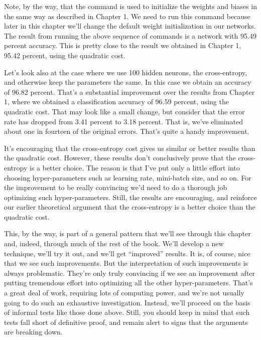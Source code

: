 \documentclass[a4paper,twoside,10pt]{book}
\begin{document}
Note, by the way, that the  command is used to initialize the weights and biases in the same way as described in Chapter 1. We need to run this command because later in this chapter we'll change the default weight initialization in our networks. The result from running the above sequence of commands is a network with 95.49 percent accuracy. This is pretty close to the result we obtained in Chapter 1, 95.42 percent, using the quadratic cost.
	
Let's look also at the case where we use 100 hidden neurons, the cross-entropy, and otherwise keep the parameters the same. In this case we obtain an accuracy of 96.82 percent. That's a substantial improvement over the results from Chapter 1, where we obtained a classification accuracy of 96.59 percent, using the quadratic cost. That may look like a small change, but consider that the error rate has dropped from 3.41 percent to 3.18 percent. That is, we've eliminated about one in fourteen of the original errors. That's quite a handy improvement.
	
It's encouraging that the cross-entropy cost gives us similar or better results than the quadratic cost. However, these results don't conclusively prove that the cross-entropy is a better choice. The reason is that I've put only a little effort into choosing hyper-parameters such as learning rate, mini-batch size, and so on. For the improvement to be really convincing we'd need to do a thorough job optimizing such hyper-parameters. Still, the results are encouraging, and reinforce our earlier theoretical argument that the cross-entropy is a better choice than the quadratic cost.
	
This, by the way, is part of a general pattern that we'll see through this chapter and, indeed, through much of the rest of the book. We'll develop a new technique, we'll try it out, and we'll get ``improved'' results. It is, of course, nice that we see such improvements. But the interpretation of such improvements is always problematic. They're only truly convincing if we see an improvement after putting tremendous effort into optimizing all the other hyper-parameters. That's a great deal of work, requiring lots of computing power, and we're not usually going to do such an exhaustive investigation. Instead, we'll proceed on the basis of informal tests like those done above. Still, you should keep in mind that such tests fall short of definitive proof, and remain alert to signs that the arguments are breaking down.
	
\end{document}
